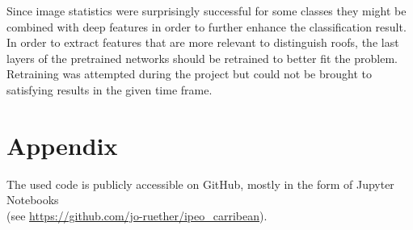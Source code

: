 \documentclass[11pt]{article}
\begin{document}
	Since image statistics were surprisingly successful for some classes they might be combined with deep features in order to further enhance the classification result.\\
	 
	In order to extract features that are more relevant to distinguish roofs, the last layers of the pretrained networks should be retrained to better fit the problem. Retraining was attempted during the project but could not be brought to satisfying results in the given time frame.\\
	

	
	\section{Appendix}

	The used code is publicly accessible on GitHub, mostly in the form of Jupyter Notebooks \\
	(see \url{https://github.com/jo-ruether/ipeo_carribean}).
	
	 
	
\end{document}

